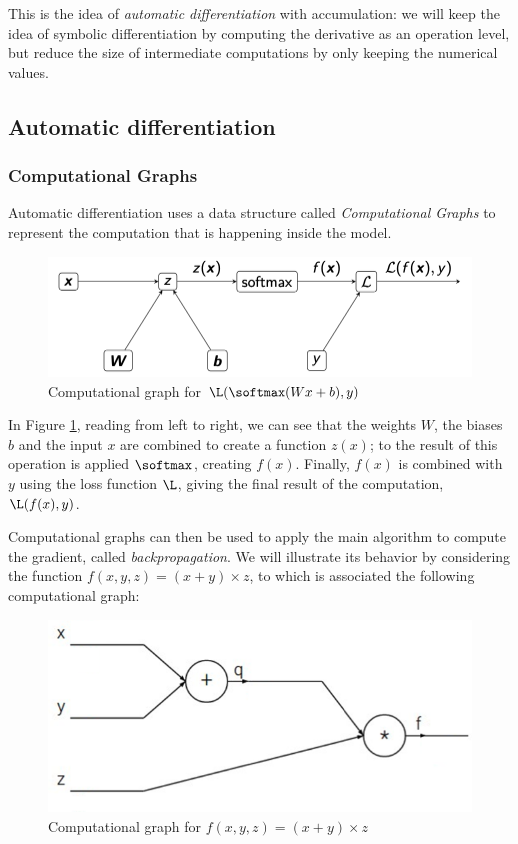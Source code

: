 This is the idea of \emph{automatic differentiation} with accumulation: we will keep the idea of symbolic differentiation by computing the derivative as an operation level, but reduce the size of intermediate computations by only keeping the numerical values.

\subsection{Automatic differentiation}
\subsubsection{Computational Graphs}
Automatic differentiation uses a data structure called \emph{Computational Graphs} to represent the computation that is happening inside the model.
\begin{figure}[H]
    \centering
    \includegraphics[width=.7\textwidth]{images/computational-graph.png}
    \caption{Computational graph for $\L(\softmax(Wx+b), y)$}
    \label{fig:computational-graph}
\end{figure}
In Figure \ref{fig:computational-graph}, reading from left to right, we can see that the weights $W$, the biases $b$ and the input $x$ are combined to create a function $z(x)$; to the result of this operation is applied $\softmax$, creating $f(x)$. Finally, $f(x)$ is combined with $y$ using the loss function $\L$, giving the final result of the computation, $\L(f(x), y)$.

Computational graphs can then be used to apply the main algorithm to compute the gradient, called \emph{backpropagation}. We will illustrate its behavior by considering the function $f(x, y, z) = (x+y)\times z$, to which is associated the following computational graph:
\begin{figure}[H]
    \centering
    \includegraphics[width=.5\textwidth]{images/simple-graph.png}
    \caption{Computational graph for $f(x, y, z) = (x+y)\times z$}
\end{figure}

